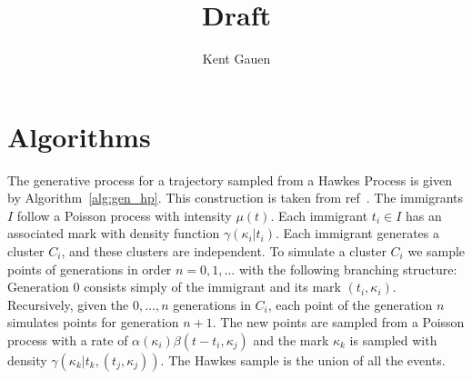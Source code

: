 \documentclass[11pt]{article}
\author{Kent Gauen}
\title{Draft}
\newcommand{\algrule}[1][.2pt]{\par\vskip.5\baselineskip\hrule height #1\par\vskip.5\baselineskip}
\begin{document}
\maketitle

\section*{Algorithms}


\noindent The generative process for a trajectory sampled from a Hawkes Process is given by Algorithm~\ref{alg:gen_hp}. This construction is taken from ref~\cite{Rasmussen2013}. The immigrants $I$ follow a Poisson process with intensity $\mu(t)$. Each immigrant $t_i \in I$ has an associated mark with density function $\gamma(\kappa_i | t_i)$. Each immigrant generates a cluster $C_i$, and these clusters are independent. To simulate a cluster $C_i$ we sample points of generations in order $n = 0, 1, \ldots$ with the following branching structure: Generation $0$ consists simply of the immigrant and its mark $(t_i,\kappa_i)$. Recursively, given the $0,\ldots,n$ generations in $C_i$, each point of the generation $n$ simulates points for generation $n+1$. The new points are sampled from a Poisson process with a rate of $\alpha(\kappa_i)\beta(t - t_i,\kappa_j)$ and the mark $\kappa_k$ is sampled with density $\gamma(\kappa_k | t_k, (t_j,\kappa_j))$. The Hawkes sample is the union of all the events. 


\vspace{1cm}
\end{document}
